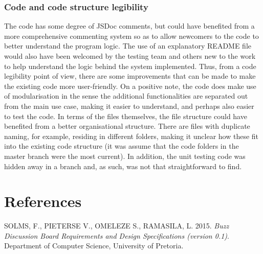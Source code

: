\documentclass[a4paper]{article}
\begin{document}
\subsubsection {Code and code structure legibility}
The code has some degree of JSDoc comments, but could have benefited from a more comprehensive commenting system so as to allow newcomers to the code to better understand the program logic. The use of an explanatory README file would also have been welcomed by the testing team and others new to the work to help understand the logic behind the system implemented. Thus, from a code legibility point of view, there are some improvements that can be made to make the existing code more user-friendly. On a positive note, the code does make use of modularisation in the sense the additional functionalities are separated out from the main use case, making it easier to understand, and perhaps also easier to test the code.
In terms of the files themselves, the file structure could have benefited from a better organisational structure. There are files with duplicate naming, for example, residing in different folders, making it unclear how these fit into the existing code structure (it was assume that the code folders in the master branch were the most current).  In addition, the unit testing code was hidden away in a branch and, as such, was not that straightforward to find.


\section {References}
SOLMS, F., PIETERSE V., OMELEZE S., RAMASILA, L. 2015. \textit{Buzz Discussion Board Requirements and Design Specifications (version 0.1)}. Department of Computer Science, University of Pretoria.
\end{document}

